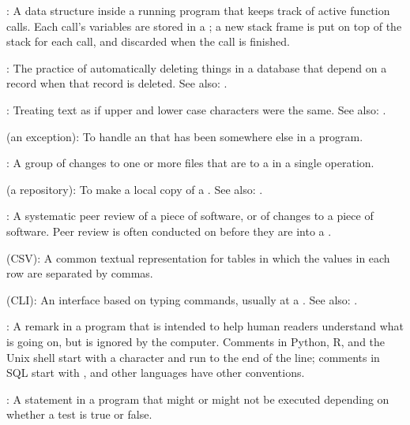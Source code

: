 :
A data structure inside a running program that
keeps track of active function calls. Each call's variables are stored
in a ; a new stack frame is put on
top of the stack for each call, and discarded when the call is finished.

:
The practice of automatically deleting things
in a database that depend on a record when that record is deleted. See
also: .

:
Treating text as if upper and lower case
characters were the same. See also: .
 
 (an exception):
To handle an  that has been 
somewhere else in a program.

:
A group of changes to one or more files that are
 to a   in a single operation.

 (a repository):
To make a local copy of a  .
See also: .

:
A systematic peer review of a piece of software,
or of changes to a piece of software.
Peer review is often conducted on 
before they are  into a .

 (CSV):
A common textual representation
for tables in which the values in each row are separated by commas.

 (CLI):
An interface based on typing
commands, usually at a . See also:
.

:
A remark in a program that is intended to help human
readers understand what is going on, but is ignored by the computer.
Comments in Python, R, and the Unix shell start with a \code{\#}
character and run to the end of the line; comments in SQL start with
\code{-{}-}, and other languages have other conventions.

:
A statement in a program that might or
might not be executed depending on whether a test is true or false.

